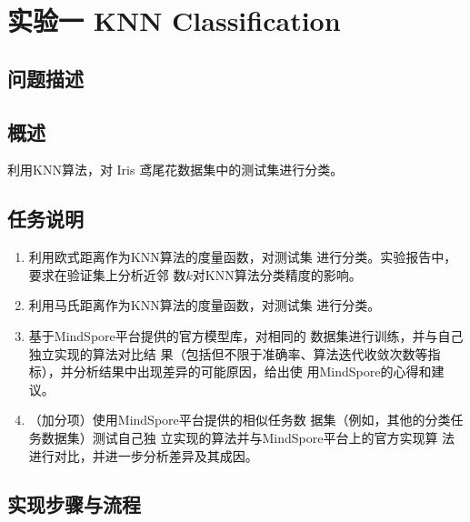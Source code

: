 \documentclass[12pt]{article}
\begin{document}
\newpage
\tableofcontents

\newpage
\section{\centering 实验一 KNN Classification}

\subsection{问题描述}
\subsection{概述}
利用KNN算法，对 Iris 鸢尾花数据集中的测试集进行分类。
\subsection{任务说明}
\begin{enumerate}
  \item 利用欧式距离作为KNN算法的度量函数，对测试集
        进行分类。实验报告中，要求在验证集上分析近邻
        数$k$对KNN算法分类精度的影响。
  \item 利用马氏距离作为KNN算法的度量函数，对测试集
        进行分类。
  \item 基于MindSpore平台提供的官方模型库，对相同的
        数据集进行训练，并与自己独立实现的算法对比结
        果（包括但不限于准确率、算法迭代收敛次数等指
        标），并分析结果中出现差异的可能原因，给出使
        用MindSpore的心得和建议。
  \item （加分项）使用MindSpore平台提供的相似任务数
        据集（例如，其他的分类任务数据集）测试自己独
        立实现的算法并与MindSpore平台上的官方实现算
        法进行对比，并进一步分析差异及其成因。
\end{enumerate}

\subsection{实现步骤与流程}
\end{document}
